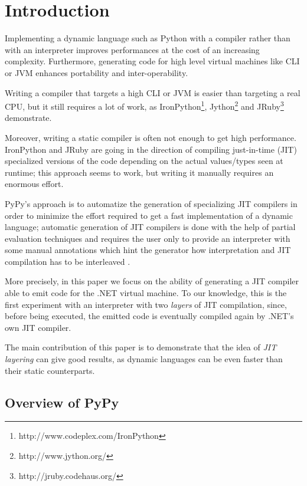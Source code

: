 \section{Introduction}
Implementing a dynamic language such as Python with a compiler rather than with an interpreter improves performances at the cost of
an increasing complexity. Furthermore, generating code for high level virtual machines like CLI or JVM enhances portability and inter-operability.

Writing a compiler that targets a high CLI or JVM is easier than targeting a real CPU, but
it still requires a lot of work, as
IronPython\footnote{http://www.codeplex.com/IronPython},
Jython\footnote{http://www.jython.org/}
and JRuby\footnote{http://jruby.codehaus.org/} demonstrate.

Moreover, writing a static compiler is often not enough to get high
performance.  IronPython and JRuby are going in the direction of
compiling just-in-time (JIT) specialized versions of the code depending
on the actual values/types seen at runtime; this approach seems to work,
but writing it manually requires an enormous effort.

PyPy's approach \cite{RiBo07_223} is to automatize the generation of 
specializing JIT compilers in order
to minimize the effort required to get a fast implementation of a
dynamic language; automatic generation of JIT compilers is done with
the help of partial evaluation techniques and requires the user only
to provide an interpreter with some manual annotations which hint
the generator how interpretation and JIT compilation has to be interleaved \cite{PyPyJIT09}.

More precisely, in this paper we focus on the ability of generating a JIT compiler able to emit code
for the .NET virtual machine. To our knowledge, this is the first experiment with an interpreter with
two \emph{layers} of JIT compilation, since, before being executed, the
emitted code is eventually compiled again by .NET's own JIT compiler.

The main contribution of this paper is to demonstrate that the idea of
\emph{JIT layering} can give good results, as dynamic languages can be even
faster than their static counterparts.


\subsection{Overview of PyPy}

